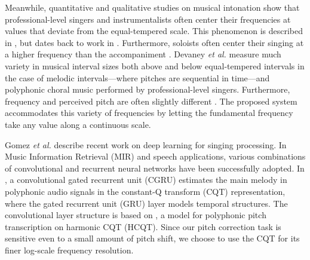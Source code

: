Meanwhile, quantitative and qualitative studies on musical intonation show that professional-level singers and instrumentalists often center their frequencies at values that deviate from the equal-tempered scale. This phenomenon is described in \cite{parncutt2018psychocultural}, but dates back to work in \cite{barbour1938just, schoen1926pitch, cameron1907tonal}. Furthermore, soloists often center their singing at a higher frequency than the accompaniment \cite{kantorski1986string, rakowski1985perception}. Devaney {\it et al.} \cite{devaney2011intonation} measure much variety in musical interval sizes both above and below equal-tempered intervals in the case of melodic intervals---where pitches are sequential in time---and polyphonic choral music performed by professional-level singers. Furthermore, frequency and perceived pitch are often slightly different \cite{parncutt2018psychocultural}. The proposed system accommodates this variety of frequencies by letting the fundamental frequency take any value along a continuous scale. 

Gomez {\it et al.} \cite{gomez2018deep} describe recent work on deep learning for singing processing. In Music Information Retrieval (MIR) and speech applications, various combinations of convolutional and recurrent neural networks have been successfully adopted. In \cite{basaranmain}, a convolutional gated recurrent unit (CGRU) estimates the main melody in polyphonic audio signals in the constant-Q transform (CQT) representation, where the gated recurrent unit (GRU) layer \cite{chung2014empirical, ChoK2014arxiv} models temporal structures. The convolutional layer structure is based on \cite{bittner2017deep}, a model for polyphonic pitch transcription on harmonic CQT (HCQT). Since our pitch correction task is sensitive even to a small amount of pitch shift, we choose to use the CQT for its finer log-scale frequency resolution. 

